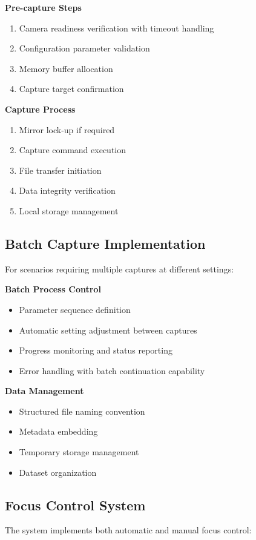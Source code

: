 \textbf{Pre-capture Steps}
\begin{enumerate}
    \item Camera readiness verification with timeout handling
    \item Configuration parameter validation
    \item Memory buffer allocation
    \item Capture target confirmation
\end{enumerate}

\textbf{Capture Process}
\begin{enumerate}
    \item Mirror lock-up if required
    \item Capture command execution
    \item File transfer initiation
    \item Data integrity verification
    \item Local storage management
\end{enumerate}

\subsection{Batch Capture Implementation}
For scenarios requiring multiple captures at different settings:

\textbf{Batch Process Control}
\begin{itemize}
    \item Parameter sequence definition
    \item Automatic setting adjustment between captures
    \item Progress monitoring and status reporting
    \item Error handling with batch continuation capability
\end{itemize}

\textbf{Data Management}
\begin{itemize}
    \item Structured file naming convention
    \item Metadata embedding
    \item Temporary storage management
    \item Dataset organization
\end{itemize}

\subsection{Focus Control System}
The system implements both automatic and manual focus control:

